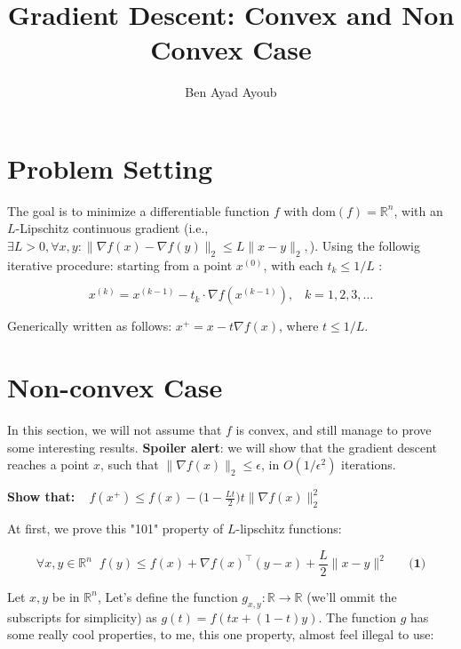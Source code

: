 \documentclass{article}
\theoremstyle{remark}
\theoremstyle{definition}
\begin{document}
\title{Gradient Descent: Convex and Non Convex Case}
\author{\Large Ben Ayad Ayoub}

\bigskip

\maketitle

\noindent

\tableofcontents

\section{Problem Setting}

The goal is to minimize a differentiable function $f$ with $\mathrm{dom}(f)=\mathbb{R}^n$, 
with an $L$-Lipschitz continuous gradient (i.e.,  $\exists L>0, \forall x,y \colon  \| \nabla f(x) - \nabla f(y)\|_2 \leq L \|x - y\|_2,$). Using the followig iterative procedure: starting from a point $x^{(0)}$, with each $t_k \leq 1/L$ : 

\[ x^{(k)} = x^{(k-1)} - t_k \cdot \nabla f(x^{(k-1)}), \;\;\; k=1,2,3,\ldots \]

Generically written as follows: $x^+ = x - t \nabla f(x)$, where $t \leq 1/L$.


\section{Non-convex Case}

In this section, we will not assume that $f$ is convex, and still manage to prove some interesting results. \textbf{Spoiler alert}: we will show that the gradient descent reaches a point $x$, such that $\|\nabla f(x)\|_2 \leq \epsilon$, in $O(1/\epsilon^2)$ iterations. \\

\begin{tcolorbox}
\center \textbf{Show that:} $\, \, \,\,\, f(x^+) \leq f(x) - \Big(1-\frac{Lt}{2} \Big) t \|\nabla f(x)\|_2^2$
\end{tcolorbox}

At first, we prove this "101" property of $L$-lipschitz functions:

\[
    \forall x,y \in \mathbb{R}^n \;\; f(y) \leq f(x) + \nabla f(x)^\intercal (y-x)  + \frac{L}{2} \|x-y\|^2 \;\;\;\;\;\;\textbf{(1)} 
\]

Let $x,y$ be in $\mathbb{R}^n$, Let's define the function $g_{x,y}: \mathbb{R} \rightarrow \mathbb{R}$ (we'll ommit the subscripts for simplicity) as $g(t)=f(t x+(1-t) y)$. The function $g$ has some really cool properties, to me, this one property, almost feel illegal to use:
\end{document}
